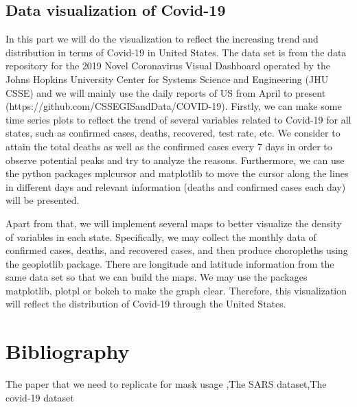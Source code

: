 \documentclass{article}
\begin{document}
\subsection{Data visualization of Covid-19}

In this part we will do the visualization to reflect the increasing trend and distribution in terms of Covid-19 in United States. The data set is from the data repository for the 2019 Novel Coronavirus Visual Dashboard operated by the Johns Hopkins University Center for Systems Science and Engineering (JHU CSSE) and we will mainly use the daily reports of US from April to present (https://github.com/CSSEGISandData/COVID-19).
Firstly, we can make some time series plots to reflect the trend of several variables related to Covid-19 for all states, such as confirmed cases, deaths, recovered, test rate, etc. We consider to attain the total deaths as well as the confirmed cases every 7 days in order to observe potential peaks and try to analyze the reasons. Furthermore, we can use the python packages mplcursor and matplotlib to move the cursor along the lines in different days and relevant information (deaths and confirmed cases each day) will be presented.

Apart from that, we will implement several maps to better visualize the density of variables in each state. Specifically, we may collect the monthly data of confirmed cases, deaths, and recovered cases, and then produce choropleths using the geoplotlib package. There are longitude and latitude information from the same data set so that we can build the maps. We may use the packages matplotlib, plotpl or bokeh to make the graph clear. Therefore, this visualization will reflect the distribution of Covid-19 through the United States.

\section{Bibliography}
The paper that we need to replicate for mask usage \cite{Steff2020mask},The SARS dataset\cite{SARSsource},The covid-19 dataset\cite{Johnhopkins}

\printbibliography
\end{document}
